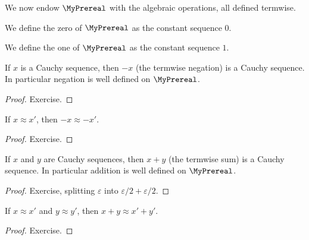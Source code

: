 We now endow $\MyPrereal$ with the algebraic operations, all defined termwise.

\begin{definition}
    \label{MyPrereal.zero}
    \leanok
We define the zero of $\MyPrereal$ as the constant sequence $0$.
\end{definition}

\begin{definition}
    \label{MyPrereal.one}
    \leanok
We define the one of $\MyPrereal$ as the constant sequence $1$.
\end{definition}

\begin{lemma}
    \label{MyPrereal.IsCauchy.neg}
    \leanok
If $x$ is a Cauchy sequence, then $-x$ (the termwise negation) is a Cauchy sequence. In particular
negation is well defined on $\MyPrereal$.
\end{lemma}
\begin{proof}
    \leanok
    Exercise.
\end{proof}

\begin{lemma}
    \label{MyPrereal.neg_quotient}
    \leanok
If $x \approx x'$, then $-x \approx -x'$.
\end{lemma}
\begin{proof}
    \leanok
    Exercise.
\end{proof}

\begin{lemma}
    \label{MyPrereal.IsCauchy.add}
    \leanok
If $x$ and $y$ are Cauchy sequences, then $x + y$ (the termwise sum) is a Cauchy sequence. In
particular addition is well defined on $\MyPrereal$.
\end{lemma}
\begin{proof}
    \leanok
    Exercise, splitting $\varepsilon$ into $\varepsilon/2 + \varepsilon/2$.
\end{proof}

\begin{lemma}
    \label{MyPrereal.add_quotient}
    \leanok
If $x \approx x'$ and $y \approx y'$, then $x + y \approx x' + y'$.
\end{lemma}
\begin{proof}
    \leanok
    Exercise.
\end{proof}

